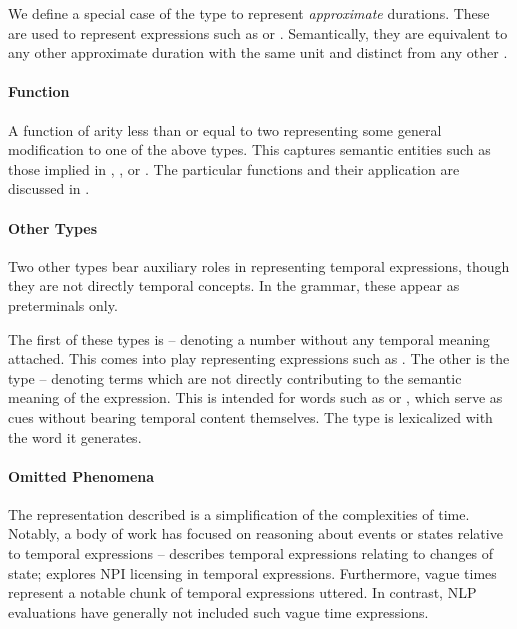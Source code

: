 We define a special case of the  type to represent 
	\textit{approximate} durations.
These are used to represent expressions such as  or
	.
Semantically, they are equivalent to any other approximate
	duration with the same unit and distinct from any other .

\paragraph{Function}
A function of arity less than or equal to two representing some
	general modification to one of the above types.
This captures semantic entities such as those implied in
	, , or .
The particular functions and their application are discussed in 
	.


\paragraph{Other Types}
Two other types bear auxiliary roles in representing temporal expressions,
	though they are not directly temporal concepts.
In the grammar, these appear as preterminals only.

The first of these types is  -- denoting a number without
	any temporal meaning attached.
This comes into play representing expressions such as .
The other is the  type -- denoting terms which are not
	directly contributing to the semantic meaning of the expression.
This is intended for words such as  or , which serve as cues
	without bearing temporal content themselves.
The  type is lexicalized with the word it generates.


\paragraph{Omitted Phenomena}
The representation described is a simplification of the complexities of
	time.
Notably, a body of work has focused on reasoning about events or states
	relative to temporal expressions -- 
	 describes temporal expressions relating to
	changes of state; 
	 explores NPI licensing in temporal
	expressions.
Furthermore, vague times represent a notable chunk of temporal expressions
	uttered.
In contrast, NLP evaluations have generally not included such vague 
	time expressions.

